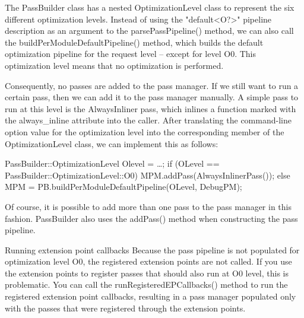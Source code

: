 \begin{enumerate}
The PassBuilder class has a nested OptimizationLevel class to represent the six different optimization levels. Instead of using the "default<O?>" pipeline description as an argument to the parsePassPipeline() method, we can also call the buildPerModuleDefaultPipeline() method, which builds the default optimization pipeline for the request level – except for level O0. This optimization level means that no optimization is performed.

Consequently, no passes are added to the pass manager. If we still want to run a certain pass, then we can add it to the pass manager manually. A simple pass to run at this level is the AlwaysInliner pass, which inlines a function marked with the always\_inline attribute into the caller. After translating the command-line option value for the optimization level into the corresponding member of the OptimizationLevel class, we can implement this as follows:

\begin{cpp}
PassBuilder::OptimizationLevel Olevel = …;
if (OLevel == PassBuilder::OptimizationLevel::O0)
    MPM.addPass(AlwaysInlinerPass());
else
    MPM = PB.buildPerModuleDefaultPipeline(OLevel, DebugPM);
\end{cpp}

Of course, it is possible to add more than one pass to the pass manager in this fashion. PassBuilder also uses the addPass() method when constructing the pass pipeline.

\end{enumerate}

\begin{myTip}{Running extension point callbacks}
Because the pass pipeline is not populated for optimization level O0, the registered extension points are not called. If you use the extension points to register passes that should also run at O0 level, this is problematic. You can call the runRegisteredEPCallbacks() method to run the registered extension point callbacks, resulting in a pass manager populated only with the passes that were registered through the extension points.
\end{myTip}

